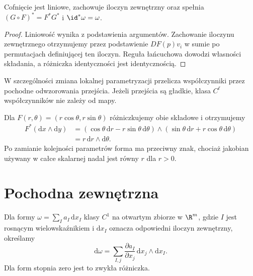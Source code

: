\begin{stwierdzenie}
\label{ma2:prop:form-pullback}
Cofnięcie jest liniowe, zachowuje iloczyn zewnętrzny
oraz spełnia $(G\circ F)^*=F^*G^*$ i
$\id^*\omega=\omega$.
\end{stwierdzenie}
\begin{proof}
Liniowość wynika z podstawienia argumentów.
Zachowanie iloczynu zewnętrznego otrzymujemy
przez podstawienie $DF(p)v_i$ w sumie po
permutacjach definiującej ten iloczyn.
Reguła łańcuchowa dowodzi własności składania,
a różniczka identyczności jest identycznością.
\end{proof}
W szczególności zmiana lokalnej parametryzacji
przelicza współczynniki przez pochodne odwzorowania
przejścia. Jeżeli przejścia są gładkie,
klasa $C^\ell$ współczynników nie zależy od mapy.

\begin{przyklad}
\label{ma2:ex:form-polar}
Dla $F(r,\theta)=(r\cos\theta,r\sin\theta)$
różniczkujemy obie składowe i otrzymujemy
\[
 \begin{aligned}
 F^*(\mathrm dx\wedge\mathrm dy)
 &= (\cos\theta\,\mathrm dr-r\sin\theta\,\mathrm d\theta)
 \wedge(\sin\theta\,\mathrm dr+r\cos\theta\,\mathrm d\theta)\\
 &=r\,\mathrm dr\wedge\mathrm d\theta.
 \end{aligned}
\]
Po zamianie kolejności parametrów forma ma
przeciwny znak, chociaż jakobian używany w całce
skalarnej nadal jest równy $r$ dla $r>0$.
\end{przyklad}

\section{Pochodna zewnętrzna}

\begin{definicja}
\label{ma2:def:exterior-derivative}
Dla formy $\omega=\sum_I a_I\,\mathrm dx_I$ klasy $C^1$
na otwartym zbiorze w $\R^m$, gdzie $I$ jest
rosnącym wielowskaźnikiem i $\mathrm dx_I$ oznacza
odpowiedni iloczyn zewnętrzny, określamy
\[
 \mathrm d\omega=\sum_{I,j}
 \frac{\partial a_I}{\partial x_j}
 \,\mathrm dx_j\wedge\mathrm dx_I .
\]
Dla form stopnia zero jest to zwykła różniczka.
\end{definicja}

